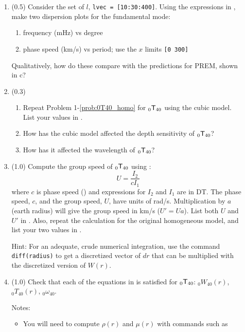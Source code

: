 \documentclass[11pt,titlepage,fleqn]{article}
\begin{document}
\begin{enumerate}
\item (0.5) Consider the set of $l$, \verb+lvec = [10:30:400]+. Using the expressions in , make two dispersion plots for the fundamental mode:
%
\begin{enumerate}
\item frequency (mHz) vs degree
\item phase speed (km/s) vs period; use the $x$ limits \verb+[0 300]+
\end{enumerate}
%
Qualitatively, how do these compare with the predictions for PREM, shown in c?

\item (0.3)
%
\begin{enumerate}
\item Repeat Problem 1-\ref{prob:0T40_homo} for $_0\mbox{${\sf T}$}_{40}$ using the cubic model. List your values in .
\item How has the cubic model affected the depth sensitivity of $_0\mbox{${\sf T}$}_{40}$?
\item How has it affected the wavelength of $_0\mbox{${\sf T}$}_{40}$?
\end{enumerate}

\label{prob:0T40_cubic}

\item (1.0) Compute the group speed of $_0\mbox{${\sf T}$}_{40}$ using \citep[][Eq. 11.67]{DT}:
%
\begin{equation}
U = \frac{I_2}{cI_1}
\end{equation}
%
where $c$ is phase speed () and expressions for $I_2$ and $I_1$ are in DT. The phase speed, $c$, and the group speed, $U$, have units of rad/s. Multiplication by $a$ (earth radius) will give the group speed in km/s ($U' = Ua$). List both $U$ and $U'$ in . Also, repeat the calculation for the original homogeneous model, and list your two values in  .

Hint: For an adequate, crude numerical integration, use the command \verb+diff(radius)+ to get a discretized vector of $dr$ that can be multiplied with the discretized version of $W(r)$.

\item (1.0) Check that each of the equations in  is satisfied for $_0\mbox{${\sf T}$}_{40}$: $_0W_{40}(r)$, $_0T_{40}(r)$, $_0\omega_{40}$.

Notes:
%
\begin{itemize}
\item You will need to compute $\rho(r)$ and $\mu(r)$ with commands such as


\end{itemize}
\end{enumerate}
\end{document}
